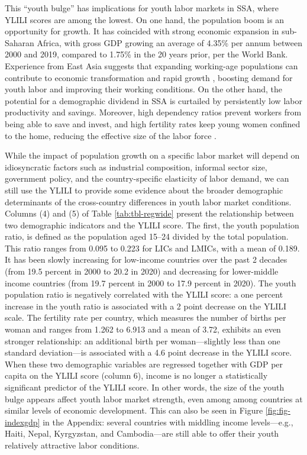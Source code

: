 \documentclass[
  a4paper, twoside, 12pt]{book}
\begin{document}
This ``youth bulge'' has implications for youth labor markets in SSA, where YLILI scores are among the lowest. On one hand, the population boom is an opportunity for growth. It has coincided with strong economic expansion in sub-Saharan Africa, with gross GDP growing an average of 4.35\% per annum between 2000 and 2019, compared to 1.75\% in the 20 years prior, per the World Bank. Experience from East Asia suggests that expanding working-age populations can contribute to economic transformation and rapid growth \autocite{bloom1998}, boosting demand for youth labor and improving their working conditions. On the other hand, the potential for a demographic dividend in SSA is curtailed by persistently low labor productivity and savings. Moreover, high dependency ratios prevent workers from being able to save and invest, and high fertility rates keep young women confined to the home, reducing the effective size of the labor force \autocite{eastwood2011}.

\begin{singlespace}

\end{singlespace}

While the impact of population growth on a specific labor market will depend on idiosyncratic factors such as industrial composition, informal sector size, government policy, and the country-specific elasticity of labor demand, we can still use the YLILI to provide some evidence about the broader demographic determinants of the cross-country differences in youth labor market conditions. Columns (4) and (5) of Table \ref{tab:tbl-regwide} present the relationship between two demographic indicators and the YLILI score. The first, the youth population ratio, is defined as the population aged 15--24 divided by the total population. This ratio ranges from 0.095 to 0.223 for LICs and LMICs, with a mean of 0.189. It has been slowly increasing for low-income countries over the past 2 decades (from 19.5 percent in 2000 to 20.2 in 2020) and decreasing for lower-middle income countries (from 19.7 percent in 2000 to 17.9 percent in 2020). The youth population ratio is negatively correlated with the YLILI score: a one percent increase in the youth ratio is associated with a 2 point decrease on the YLILI scale. The fertility rate per country, which measures the number of births per woman and ranges from 1.262 to 6.913 and a mean of 3.72, exhibits an even stronger relationship: an additional birth per woman---slightly less than one standard deviation---is associated with a 4.6 point decrease in the YLILI score. When these two demographic variables are regressed together with GDP per capita on the YLILI score (column 6), income is no longer a statistically significant predictor of the YLILI score. In other words, the size of the youth bulge appears affect youth labor market strength, even among among countries at similar levels of economic development. This can also be seen in Figure \ref{fig:fig-indexgdp} in the Appendix: several countries with middling income levels---e.g., Haiti, Nepal, Kyrgyzstan, and Cambodia---are still able to offer their youth relatively attractive labor conditions.
\end{document}
